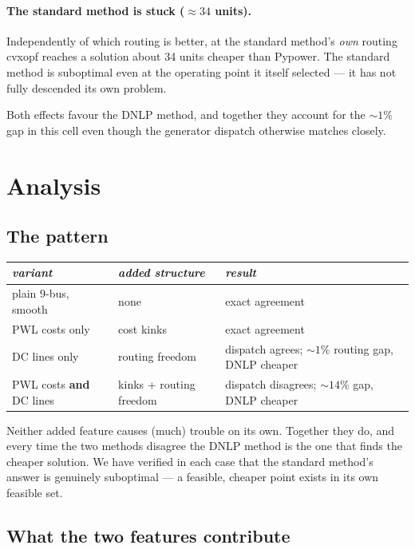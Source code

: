 \documentclass[11pt]{article}
\begin{document}
\paragraph{The standard method is stuck ($\approx 34$ units).} Independently of
which routing is better, at the standard method's \emph{own} routing cvxopf
reaches a solution about 34 units cheaper than Pypower. The standard method is
suboptimal even at the operating point it itself selected --- it has not fully
descended its own problem.

Both effects favour the DNLP method, and together they account for the
${\sim}1\%$ gap in this cell even though the generator dispatch otherwise matches
closely.

\section{Analysis}

\subsection{The pattern}

\begin{center}
	\begin{tabularx}{\textwidth}{l l X}
		\toprule
		\emph{variant} & \emph{added structure} & \emph{result} \\
		\midrule
		plain 9-bus, smooth & none & exact agreement \\
		PWL costs only & cost kinks & exact agreement \\
		DC lines only & routing freedom & dispatch agrees; ${\sim}1\%$ routing gap, \newline DNLP 
		cheaper \\
		PWL costs \textbf{and} DC lines & kinks + routing freedom & dispatch disagrees; ${\sim}14\%$ 
		gap, \newline DNLP cheaper \\
		\bottomrule
	\end{tabularx}
\end{center}

Neither added feature causes (much) trouble on its own. Together they do, and
every time the two methods disagree the DNLP method is the one that finds the
cheaper solution. We have verified in each case that the standard method's
answer is genuinely suboptimal --- a feasible, cheaper point exists in its own
feasible set.

\subsection{What the two features contribute}
\end{document}
